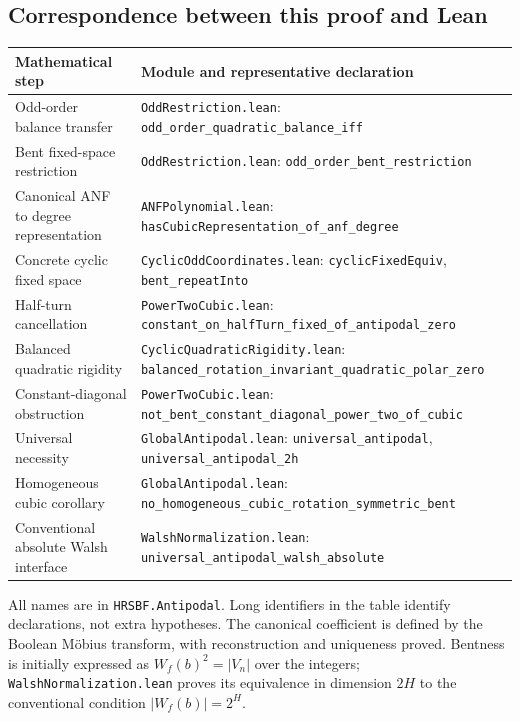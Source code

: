 \documentclass[11pt,a4paper]{article}
\theoremstyle{remark}
\theoremstyle{plain}
\begin{document}
\subsection{Correspondence between this proof and Lean}
\begingroup\small
\setlength{\tabcolsep}{4pt}
\begin{longtable}{@{}>{\raggedright\arraybackslash}p{}>{\raggedright\arraybackslash}p{}@{}}
\toprule Mathematical step & Module and representative declaration \\\midrule
\endhead
Odd-order balance transfer & \nolinkurl{OddRestriction.lean}: \nolinkurl{odd_order_quadratic_balance_iff} \\
Bent fixed-space restriction & \nolinkurl{OddRestriction.lean}: \nolinkurl{odd_order_bent_restriction} \\
Canonical ANF to degree representation & \nolinkurl{ANFPolynomial.lean}: \nolinkurl{hasCubicRepresentation_of_anf_degree} \\
Concrete cyclic fixed space & \nolinkurl{CyclicOddCoordinates.lean}: \nolinkurl{cyclicFixedEquiv}, \nolinkurl{bent_repeatInto} \\
Half-turn cancellation & \nolinkurl{PowerTwoCubic.lean}: \nolinkurl{constant_on_halfTurn_fixed_of_antipodal_zero} \\
Balanced quadratic rigidity & \nolinkurl{CyclicQuadraticRigidity.lean}: \nolinkurl{balanced_rotation_invariant_quadratic_polar_zero} \\
Constant-diagonal obstruction & \nolinkurl{PowerTwoCubic.lean}: \nolinkurl{not_bent_constant_diagonal_power_two_of_cubic} \\
Universal necessity & \nolinkurl{GlobalAntipodal.lean}: \nolinkurl{universal_antipodal}, \nolinkurl{universal_antipodal_2h} \\
Homogeneous cubic corollary & \nolinkurl{GlobalAntipodal.lean}: \nolinkurl{no_homogeneous_cubic_rotation_symmetric_bent} \\
Conventional absolute Walsh interface & \nolinkurl{WalshNormalization.lean}: \nolinkurl{universal_antipodal_walsh_absolute} \\
\bottomrule
\end{longtable}
\endgroup
All names are in \nolinkurl{HRSBF.Antipodal}. Long identifiers in the table identify declarations, not extra hypotheses. The canonical coefficient is defined by the Boolean M\"obius transform, with reconstruction and uniqueness proved. Bentness is initially expressed as $W_f(b)^2=|V_n|$ over the integers; \nolinkurl{WalshNormalization.lean} proves its equivalence in dimension $2H$ to the conventional condition $|W_f(b)|=2^H$.
\end{document}
